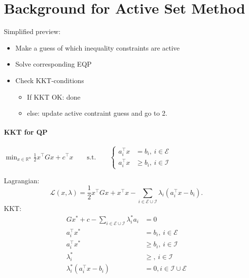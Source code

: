 \documentclass{article}
\begin{document}
\maketitle

\section{Background for Active Set Method}

Simplified preview:
\medskip \begin{itemize}
  \item Make a guess of which inequality constraints are active
  \item Solve corresponding EQP
  \item Check KKT-conditions
        \begin{itemize}
          \item If KKT OK: done
          \item else: update active contraint guess and go to 2.
        \end{itemize}
\end{itemize}

\paragraph{KKT for QP} $\min_{x\in\mathbb{R}^{n}} \frac{1}{2} x^{\top}Gx + c^{\top}x \qquad \text{s.t.}\qquad\left\{
  \begin{aligned}
    a_i^{\top}x & = b_i,\  i\in\mathcal{E}    \\
    a_i^{\top}x & \geq b_i ,\ i\in\mathcal{I}
  \end{aligned}
  \right.$

Lagrangian:
\[
  \mathcal{L}(x, \lambda) = \frac{1}{2}x^{\top}Gx + x^{\top}x - \sum_{i \in\mathcal{E}\cup\mathcal{I}} \lambda_i(a_i^{\top}x-b_i)
  .\]
KKT:
\begin{align*}
  Gx^*+ c - \sum_{i \in\mathcal{E}\cup\mathcal{I}}\lambda_i^*a_i & = 0                                  \\
  a_i^{\top}x^*                                                  & = b_i,\ i\in\mathcal{E}              \\
  a_i^{\top}x^*                                                  & \geq b_i,\  i\in \mathcal{I}         \\
  \lambda_i^*                                                    & \geq ,\ i\in \mathcal{I}             \\
  \lambda_i ^*(a_i^{\top}x-b_i)                                  & = 0, i\in \mathcal{I}\cup\mathcal{E}
\end{align*}
\end{document}
